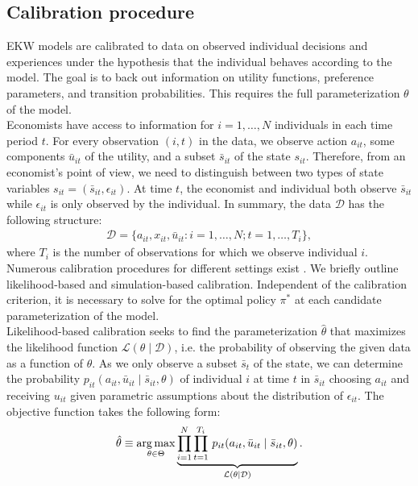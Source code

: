 \subsection{Calibration procedure}
EKW models are calibrated to data on observed individual decisions and experiences under the hypothesis that the individual behaves according to the model. The goal is to back out information on utility functions, preference parameters, and transition probabilities. This requires the full parameterization $\theta$ of the model.\\

\noindent Economists have access to information for $i = 1, \hdots, N$ individuals in each time period $t$. For every observation $(i, t)$ in the data, we observe action $a_{it}$, some components $\bar{u}_{it}$ of the utility, and a subset $\bar{s}_{it}$ of the state $s_{it}$. Therefore, from an economist's point of view, we need to distinguish between two types of state variables $s_{it} = (\bar{s}_{it}, \epsilon_{it})$. At time $t$, the economist and individual both observe $\bar{s}_{it}$ while $\epsilon_{it}$ is only observed by the individual. In summary, the data $\mathcal{D}$ has the following structure:
%
\begin{align*}
  \mathcal{D} = \{a_{it}, x_{it}, \bar{u}_{it}: i = 1, \hdots, N; t = 1, \hdots, T_i\},
\end{align*}
where $T_i$ is the number of observations for which we observe individual $i$.\\

\noindent Numerous calibration procedures for different settings exist \citep{Davidson.2003, Gourieroux.1996}. We briefly outline likelihood-based and simulation-based calibration. Independent of the calibration criterion, it is necessary to solve for the optimal policy $\pi^*$ at each candidate parameterization of the model.\\

\noindent Likelihood-based calibration seeks to find the parameterization $\hat{\theta}$ that maximizes the likelihood function $\mathcal{L}(\theta\mid\mathcal{D})$, i.e. the probability of observing the given data as a function of $\theta$. As we only observe a subset $\bar{s}_t$ of the state, we can determine the probability $p_{it}(a_{it}, \bar{u}_{it} \mid \bar{s}_{it}, \theta)$ of individual $i$ at time $t$ in $\bar{s}_{it}$ choosing $a_{it}$ and receiving $u_{it}$ given parametric assumptions about the distribution of $\epsilon_{it}$. The objective function takes the following form:
%
\begin{align*}
  \hat{\theta} \equiv \operatorname*{arg\,max}_{\theta \in \Theta}  \underbrace{\prod^N_{i= 1} \prod^{T_i}_{t= 1}\, p_{it}(a_{it}, \bar{u}_{it} \mid \bar{s}_{it}, \theta)}_{\mathcal{L}(\theta\mid\mathcal{D})}.
\end{align*}

